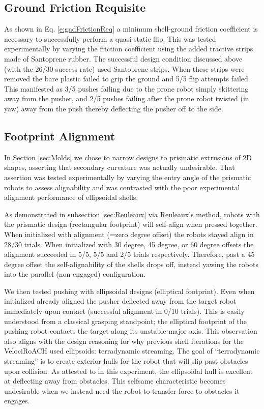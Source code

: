 \documentclass[letterpaper]{report}
\begin{document}
\subsection{Ground Friction Requisite}
As shown in Eq. \ref{e:gndFrictionReq} a minimum shell-ground friction coefficient is necessary to successfully perform a quasi-static flip.
This was tested experimentally by varying the friction coefficient using the added tractive strips made of Santoprene rubber.
The successful design condition discussed above (with the 26/30 success rate) used Santoprene strips.
When these strips were removed the bare plastic failed to grip the ground and 5/5 flip attempts failed.
This manifested as 3/5 pushes failing due to the prone robot simply skittering away from the pusher, and 2/5 pushes failing after the prone robot twisted (in yaw) away from the push thereby deflecting the pusher off to the side.

\subsection{Footprint Alignment}
In Section \ref{sec:Molds} we chose to narrow designs to prismatic extrusions of 2D shapes, asserting that secondary curvature was actually undesirable.
That assertion was tested experimentally by varying the entry angle of the prismatic robots to assess alignability and was contrasted with the poor experimental alignment performance of ellipsoidal shells.

As demonstrated in subsection \ref{sec:Reuleaux} via Reuleaux's method, robots with the prismatic design (rectangular footprint) will self-align when pressed together.
When initialized with alignment (=zero degree offset) the robots stayed align in 28/30 trials.
When initialized with 30 degree, 45 degree, or 60 degree offsets the alignment succeeded in 5/5, 5/5 and 2/5 trials respectively.
Therefore, past a 45 degree offset the self-alignability of the shells drops off, instead yawing the robots into the parallel (non-engaged) configuration.

We then tested pushing with ellipsoidal designs (elliptical footprint).
Even when initialized already aligned the pusher deflected away from the target robot immediately upon contact (successful alignment in 0/10 trials).
This is easily understood from a classical grasping standpoint; the elliptical footprint of the pushing robot contacts the target along its unstable major axis.
This observation also aligns with the design reasoning for why previous shell iterations for the VelociRoACH used ellipsoids: terradynamic streaming.
The goal of ``terradynamic streaming'' is to create exterior hulls for the robot that will slip past obstacles upon collision.
As attested to in this experiment, the ellipsoidal hull is excellent at deflecting away from obstacles.
This selfsame characteristic becomes undesirable when we instead need the robot to transfer force to obstacles it engages.
\end{document}
